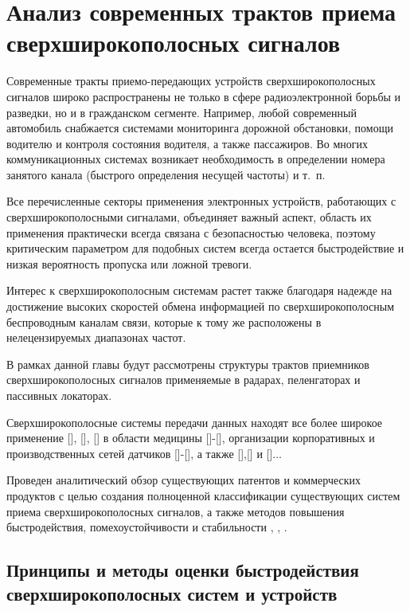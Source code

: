 \chapter{Анализ современных трактов приема сверхширокополосных сигналов}

Современные тракты приемо-передающих устройств сверхширокополосных сигналов широко распространены не только в сфере радиоэлектронной борьбы и разведки, но и в гражданском сегменте. Например, любой современный автомобиль снабжается системами мониторинга дорожной обстановки, помощи водителю и контроля состояния водителя, а также пассажиров. Во многих коммуникационных системах возникает необходимость в определении номера занятого канала (быстрого определения несущей частоты) и т.~п.

Все перечисленные секторы применения электронных устройств, работающих с сверхширокополосными сигналами, объединяет важный аспект, область их применения практически всегда связана с безопасностью человека, поэтому критическим параметром для подобных систем всегда остается быстродействие и низкая вероятность пропуска или ложной тревоги.

Интерес к сверхширокополосным системам растет также благодаря надежде на достижение высоких скоростей обмена информацией по сверхширокополосным беспроводным каналам связи, которые к тому же расположены в нелецензируемых диапазонах частот.

В рамках данной главы будут рассмотрены структуры трактов приемников сверхширокополосных сигналов применяемые в радарах, пеленгаторах и пассивных локаторах.

Сверхширокополосные системы передачи данных находят все более широкое применение [], [], [] в области медицины []-[], организации корпоративных и производственных сетей датчиков []-[], а также [],[] и []...

Проведен аналитический обзор существующих патентов и коммерческих продуктов с целью создания полноценной классификации существующих систем приема сверхширокополосных сигналов, а также методов повышения быстродействия, помехоустойчивости и стабильности \cite{jia_4-bit_2020}, \cite{cheng_introduction_2021, lin_60-ghz_nodate, gray_analysis_2009}, \cite{nagulu_ultra-wideband_2021, rahimpour_design_2019, rucker_013m_2009, pelgrom_matching_1989-1, du_112-gss_2019, hartmann_low-power_2007, saha_6-20_2012, johansen_analysis_2005, shahramian_millimeter-wave_2011, du_256-gss_2018, dyskin_wideband_2016, noauthor_photonic_nodate, noauthor_microwave_2005}.

\section{Принципы и методы оценки быстродействия сверхширокополосных систем и устройств}

